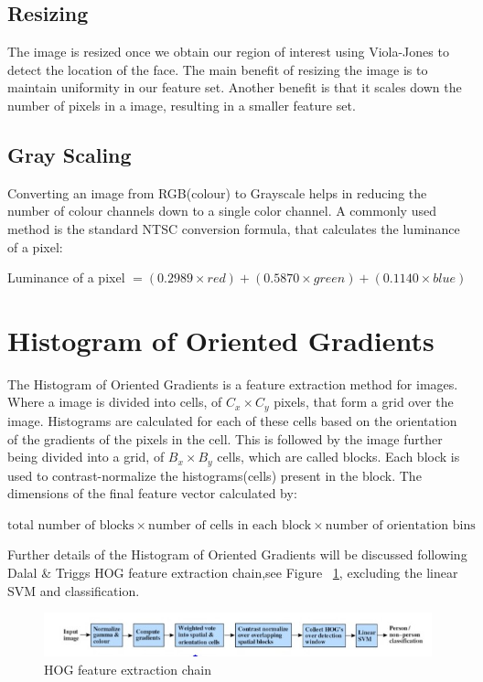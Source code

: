	\subsection{Resizing} 
	The image is resized once we obtain our region of interest using Viola-Jones to detect the location of the face. The main benefit of resizing the image is to maintain uniformity in our feature set. Another benefit is that it scales down the number of pixels in a image, resulting in a smaller feature set\cite{pre}. 
	\subsection{Gray Scaling}
	Converting an image from RGB(colour) to Grayscale helps in reducing the number of colour channels down to a single color channel. A commonly used method is the standard NTSC conversion formula, that calculates the luminance of a pixel\cite{pre}:

	Luminance of a pixel $= (0.2989 \times red) + (0.5870 \times green) + (0.1140 \times blue) $
	 
\section{Histogram of Oriented Gradients}   
The Histogram of Oriented Gradients is a feature extraction method for images. Where a image is divided into cells, of $C_x \times C_y$ pixels, that form a grid over the image. Histograms are calculated for each of these cells based on the orientation of the gradients of the pixels in the cell. This is followed by the image further being divided into a grid, of $B_x \times B_y$ cells, which are called blocks. Each block is used to contrast-normalize the histograms(cells) present in the block. The dimensions of the final feature vector calculated by: 

$\textrm{total number of blocks} \times \textrm{number of cells in each block} \times \textrm{number of orientation bins}$
\begin{flushleft}
Further details of the Histogram of Oriented Gradients will be discussed following Dalal \& Triggs HOG feature extraction chain,see Figure ~\ref{fig:hhog}, excluding the linear SVM and classification\cite{hog}.
\end{flushleft}
\begin{figure}[H]
  \centering
  \includegraphics[scale=0.6]{chain}
  \caption{HOG feature extraction chain\cite{hog}}
  \label{fig:hhog}
\end{figure}

